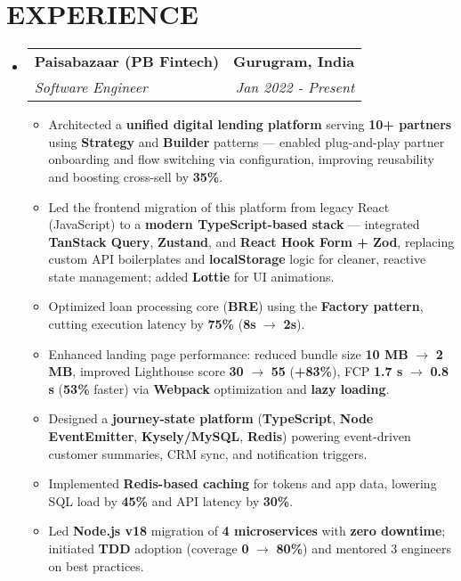 \documentclass[letterpaper,11pt]{article}
\makeatletter
\newcommand{\resumeSubheading}[4]{
  \vspace{-2pt}\item
    \begin{tabular*}{1.0\textwidth}[t]{l@{\extracolsep{\fill}}r}
      \textbf{\large#1} & \textbf{\small #2} \\
      \textit{\large#3} & \textit{\small #4} \\
    \end{tabular*}\vspace{-7pt}
}
\newcommand{\resumeItem}[1]{
  \item\small{
    {#1 \vspace{-2pt}}
  }
}
\newcommand{\resumeSubHeadingListStart}{\begin{itemize}[leftmargin=0.0in, label={}]}
\newcommand{\resumeSubHeadingListEnd}{\end{itemize}}
\newcommand{\resumeItemListStart}{\begin{itemize}}
\newcommand{\resumeItemListEnd}{\end{itemize}\vspace{-5pt}}
\makeatother
\begin{document}
\section{EXPERIENCE}
  \resumeSubHeadingListStart
    \resumeSubheading
      {Paisabazaar (PB Fintech)}{Gurugram, India}
      {Software Engineer}{Jan 2022 - Present}
      \resumeItemListStart
        \resumeItem{Architected a \textbf{unified digital lending platform} serving \textbf{10+ partners} using \textbf{Strategy} and \textbf{Builder} patterns — enabled plug-and-play partner onboarding and flow switching via configuration, improving reusability and boosting cross-sell by \textbf{35\%}.}
        \resumeItem{Led the frontend migration of this platform from legacy React (JavaScript) to a \textbf{modern TypeScript-based stack} — integrated \textbf{TanStack Query}, \textbf{Zustand}, and \textbf{React Hook Form + Zod}, replacing custom API boilerplates and \textbf{localStorage} logic for cleaner, reactive state management; added \textbf{Lottie} for UI animations.}
        \resumeItem{Optimized loan processing core (\textbf{BRE}) using the \textbf{Factory pattern}, cutting execution latency by \textbf{75\%} (\textbf{8s} $\rightarrow$ \textbf{2s}).}
        \resumeItem{Enhanced landing page performance: reduced bundle size \textbf{10 MB} $\rightarrow$ \textbf{2 MB}, improved Lighthouse score \textbf{30} $\rightarrow$ \textbf{55} (\textbf{+83\%}), FCP \textbf{1.7 s} $\rightarrow$ \textbf{0.8 s} (\textbf{53\%} faster) via \textbf{Webpack} optimization and \textbf{lazy loading}.}
        \resumeItem{Designed a \textbf{journey-state platform} (\textbf{TypeScript}, \textbf{Node EventEmitter}, \textbf{Kysely/MySQL}, \textbf{Redis}) powering event-driven customer summaries, CRM sync, and notification triggers.}
        \resumeItem{Implemented \textbf{Redis-based caching} for tokens and app data, lowering SQL load by \textbf{45\%} and API latency by \textbf{30\%}.}
        \resumeItem{Led \textbf{Node.js v18} migration of \textbf{4 microservices} with \textbf{zero downtime}; initiated \textbf{TDD} adoption (coverage \textbf{0} $\rightarrow$ \textbf{80\%}) and mentored 3 engineers on best practices.}
      \resumeItemListEnd
  \resumeSubHeadingListEnd

\end{document}
